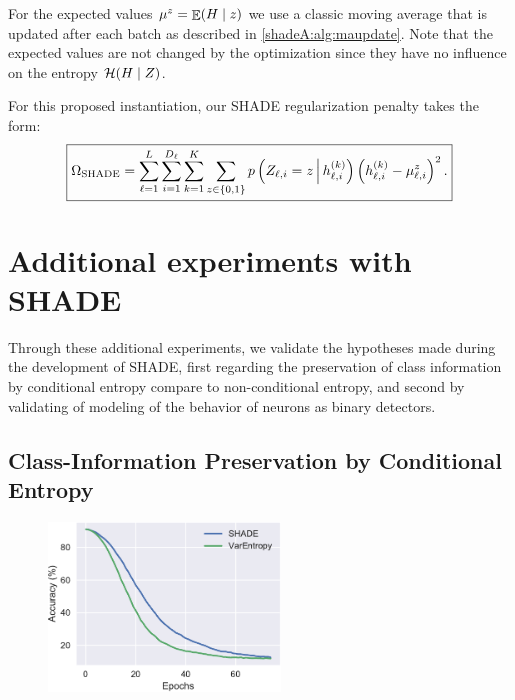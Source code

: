         For the expected values $\mu^z = \mathop{\mathbb{E}}(H\mid z)$  we use a classic moving average that is updated after each batch as described in \autoref{shadeA:alg:maupdate}. Note that the expected values are not changed by the optimization since they have no influence on the entropy $\mathcal{H}(H\mid Z)$.
        
        For this proposed instantiation, our \ac{SHADE} regularization penalty takes the form:
        \begin{equation}
            \boxed{
            \Omega_{\mathrm{SHADE}} = \sum_{\ell=1}^{L}\sum_{i=1}^{D_\ell}\sum_{k=1}^K \sum_{z \in \{0,1\}} p\left(Z_{\ell,i} = z\,\middle|\, \yi_{\ell,i}^{(k)}\right) %
            \left({\yi_{\ell,i}^{(k)}} - \mu_{\ell,i}^ z\right)^2.
            }
        \end{equation}



\section{Additional experiments with SHADE}

Through these additional experiments, we validate the hypotheses made during the development of \ac{SHADE}, first regarding the preservation of class information by conditional entropy compare to non-conditional entropy, and second by validating of modeling of the behavior of neurons as binary detectors.

\subsection{Class-Information Preservation by Conditional Entropy}
\label{shadeA:sec:exp_cond}

\begin{figure}[tb]
    \centering
    \includegraphics[width=0.55\textwidth]{images/shade_SHADE_unlearn.pdf}
    \label{shade:fig:unlearn}
\end{figure}

